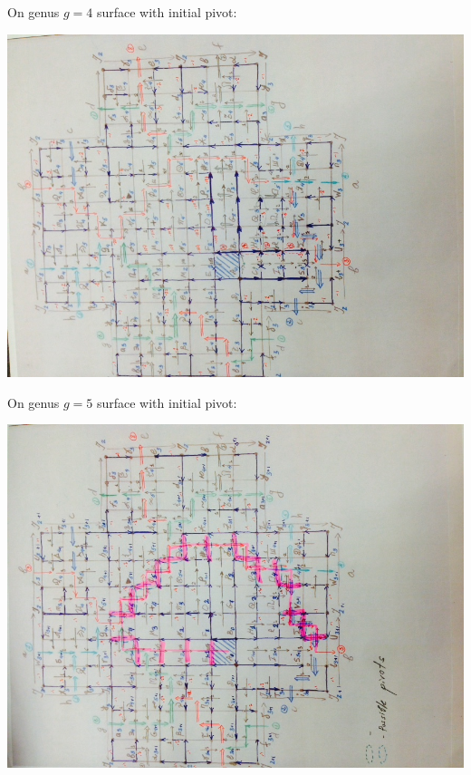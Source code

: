 \documentclass{article}
\begin{document}
\newpage
On genus $g = 4$ surface with initial pivot:
\begin{center}
\includegraphics[angle = -90, scale = 0.7]{figures/genus4_after4Pivots.jpg}
\end{center}




\newpage
On genus $g = 5$ surface with initial pivot:
\begin{center}
\includegraphics[angle = -90, scale = 0.7]{figures/genus4_after5Pivots.jpg}
\end{center}

\printbibliography
\end{document}
